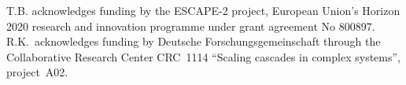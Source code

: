 \documentclass{ametsoc}
\theoremstyle{definition}
\begin{document}
% 

\acknowledgments

T.B. acknowledges funding by the ESCAPE-2 project, European Union's Horizon 2020 research and innovation programme under grant agreement No 800897. R.K.\ acknowledges funding by Deutsche Forschungsgemeinschaft through the Collaborative Research Center CRC~1114 ``Scaling cascades in complex systems'', project~A02. 






%

\end{document}
